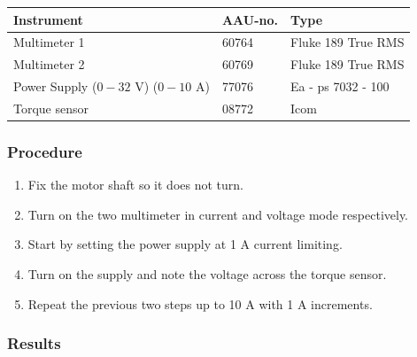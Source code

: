 \begin{table}[H]
\begin{tabular}{|l|l|p{4cm}|}
\hline%
  \textbf{Instrument}                        &  \textbf{AAU-no.}  &  \textbf{Type}       \\
\hline%
  Multimeter 1                               &  60764             &  Fluke 189 True RMS  \\
\hline%
  Multimeter 2                   		         &  60769             &  Fluke 189 True RMS  \\
\hline%
  Power Supply ($0 - 32$ V) ($0 - 10$ A)     &  77076             &  Ea - ps 7032 - 100  \\
\hline%
  Torque sensor                              &  08772             &  Icom                \\
\hline%
\end{tabular}
\end{table}

\subsubsection{Procedure}

\begin{enumerate}
  \item Fix the motor shaft so it does not turn.
  \item Turn on the two multimeter in current and voltage mode respectively.
  \item Start by setting the power supply at 1 A current limiting.
  \item Turn on the supply and note the voltage across the torque sensor.
  \item Repeat the previous two steps up to 10 A with 1 A increments.
\end{enumerate}

\subsubsection{Results}

